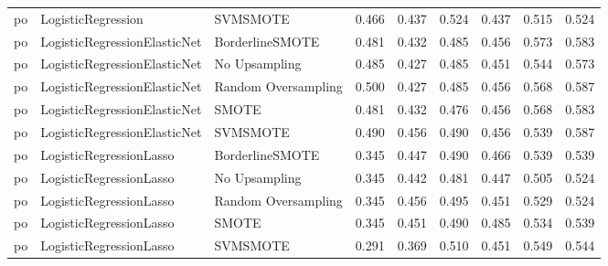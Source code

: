 \begin{tabular}{lllllllll}
      po &           LogisticRegression &            SVMSMOTE & 0.466 &                     0.437 &                 0.524 &                  0.437 &                                   0.515 &     0.524 \\
      po & LogisticRegressionElasticNet &     BorderlineSMOTE & 0.481 &                     0.432 &                 0.485 &                  0.456 &                                   0.573 &     0.583 \\
      po & LogisticRegressionElasticNet &       No Upsampling & 0.485 &                     0.427 &                 0.485 &                  0.451 &                                   0.544 &     0.573 \\
      po & LogisticRegressionElasticNet & Random Oversampling & 0.500 &                     0.427 &                 0.485 &                  0.456 &                                   0.568 &     0.587 \\
      po & LogisticRegressionElasticNet &               SMOTE & 0.481 &                     0.432 &                 0.476 &                  0.456 &                                   0.568 &     0.583 \\
      po & LogisticRegressionElasticNet &            SVMSMOTE & 0.490 &                     0.456 &                 0.490 &                  0.456 &                                   0.539 &     0.587 \\
      po &      LogisticRegressionLasso &     BorderlineSMOTE & 0.345 &                     0.447 &                 0.490 &                  0.466 &                                   0.539 &     0.539 \\
      po &      LogisticRegressionLasso &       No Upsampling & 0.345 &                     0.442 &                 0.481 &                  0.447 &                                   0.505 &     0.524 \\
      po &      LogisticRegressionLasso & Random Oversampling & 0.345 &                     0.456 &                 0.495 &                  0.451 &                                   0.529 &     0.524 \\
      po &      LogisticRegressionLasso &               SMOTE & 0.345 &                     0.451 &                 0.490 &                  0.485 &                                   0.534 &     0.539 \\
      po &      LogisticRegressionLasso &            SVMSMOTE & 0.291 &                     0.369 &                 0.510 &                  0.451 &                                   0.549 &     0.544 \\

\end{tabular}
